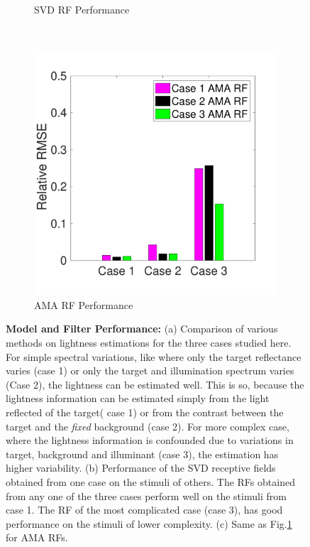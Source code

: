 \documentclass{jov}
\begin{document}
\begin{figure}
\begin{subfigure}[b]{0.3 \textwidth}
	\caption{SVD RF Performance}
	\label{fig:SVDBAR}
    \end{subfigure}
    ~ %
        \begin{subfigure}[b]{0.3 \textwidth}
	\includegraphics[width=\textwidth]{Figure10/AMASummaryBarGraph.pdf}
	\caption{AMA RF Performance}
	\label{fig:AMABAR}
    \end{subfigure}
\caption{{\bf Model and Filter Performance:} (a) Comparison of various methods on lightness estimations for the three cases studied here. For simple spectral variations, like where only the target reflectance varies (case 1) or only the target and illumination spectrum varies (Case 2), the lightness can be estimated well. This is so, because the lightness information can be estimated simply from the light reflected of the target( case 1) or from the contrast between the target and the {\it fixed} background (case 2). For more complex case, where the lightness information is confounded due to variations in target, background and illuminant (case 3), the estimation has higher variability. (b) Performance of the SVD receptive fields obtained from one case on the stimuli of others. The RFs obtained from any one of the three cases perform well on the stimuli from case 1. The RF of the most complicated case (case 3), has good performance on the stimuli of lower complexity. (c) Same as Fig.\ref{fig:SVDBAR} for AMA RFs.}
 \label{fig:barGraphs}
\end{figure}
\end{document}

